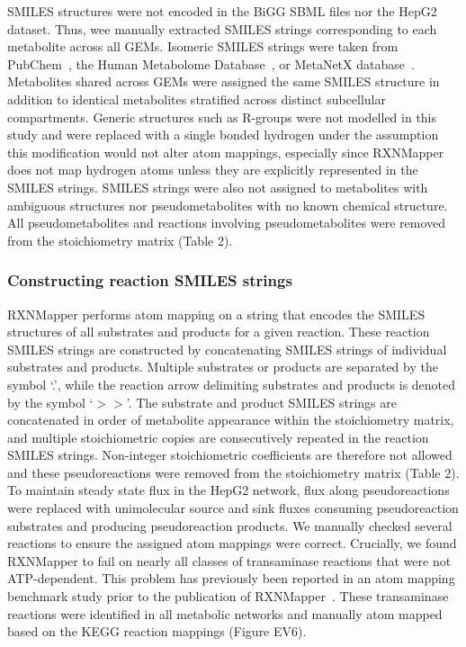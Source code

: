 \documentclass[12pt]{article}
\begin{document}
SMILES structures were not encoded in the BiGG SBML files nor the HepG2
dataset. Thus, wee manually extracted SMILES strings corresponding to each
metabolite across all GEMs. Isomeric SMILES strings were taken from
PubChem~\citep{KimSunghwan2023P2u}, the Human Metabolome
Database~\citep{WishartDavidS2022H5tH}, or MetaNetX
database~\citep{MorettiSebastien2021Munf}. Metabolites shared across GEMs
were assigned the same SMILES structure in addition to identical
metabolites stratified across distinct subcellular compartments. Generic
structures such as R-groups were not modelled in this study and were
replaced with a single bonded hydrogen under the assumption this
modification would not alter atom mappings, especially since RXNMapper
does not map hydrogen atoms unless they are explicitly represented in the
SMILES strings. SMILES strings were also not assigned to metabolites with
ambiguous structures nor pseudometabolites with no known chemical
structure. All pseudometabolites and reactions involving pseudometabolites
were removed from the stoichiometry matrix (Table 2).

\subsubsection*{Constructing reaction SMILES strings}

RXNMapper performs atom mapping on a string that encodes the SMILES
structures of all substrates and products for a given reaction. These
reaction SMILES strings are constructed by concatenating SMILES strings of
individual substrates and products. Multiple substrates or products are
separated by the symbol `.', while the reaction arrow delimiting
substrates and products is denoted by the symbol `$>>$'. The substrate and
product SMILES strings are concatenated in order of metabolite appearance
within the stoichiometry matrix, and multiple stoichiometric copies are
consecutively repeated in the reaction SMILES strings. Non-integer
stoichiometric coefficients are therefore not allowed and these
pseudoreactions were removed from the stoichiometry matrix (Table 2). To
maintain steady state flux in the HepG2 network, flux along
pseudoreactions were replaced with unimolecular source and sink fluxes
consuming pseudoreaction substrates and producing pseudoreaction products.
We manually checked several reactions to ensure the assigned atom mappings
were correct. Crucially, we found RXNMapper to fail on nearly all classes
of transaminase reactions that were not ATP-dependent. This problem has
previously been reported in an atom mapping benchmark study prior to the
publication of RXNMapper~\citep{PreciatGonzalezGermanA.2017Ceoa}. These
transaminase reactions were identified in all metabolic networks and
manually atom mapped based on the KEGG reaction mappings (Figure EV6).
\end{document}
